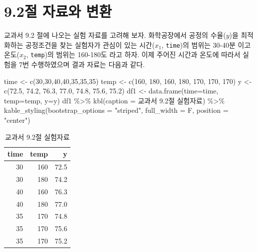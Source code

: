 \documentclass[
]{book}
\newenvironment{Shaded}{\begin{snugshade}}{\end{snugshade}}
\newcommand{\AttributeTok}[1]{\textcolor[rgb]{0.77,0.63,0.00}{#1}}
\newcommand{\DecValTok}[1]{\textcolor[rgb]{0.00,0.00,0.81}{#1}}
\newcommand{\FloatTok}[1]{\textcolor[rgb]{0.00,0.00,0.81}{#1}}
\newcommand{\FunctionTok}[1]{\textcolor[rgb]{0.00,0.00,0.00}{#1}}
\newcommand{\NormalTok}[1]{#1}
\newcommand{\OtherTok}[1]{\textcolor[rgb]{0.56,0.35,0.01}{#1}}
\newcommand{\SpecialCharTok}[1]{\textcolor[rgb]{0.00,0.00,0.00}{#1}}
\newcommand{\StringTok}[1]{\textcolor[rgb]{0.31,0.60,0.02}{#1}}
\theoremstyle{definition}
\theoremstyle{definition}
\theoremstyle{definition}
\theoremstyle{definition}
\theoremstyle{remark}
\begin{document}
\hypertarget{uxc808-uxc790uxb8ccuxc640-uxbcc0uxd658}{%
\section{9.2절 자료와 변환}\label{uxc808-uxc790uxb8ccuxc640-uxbcc0uxd658}}

교과서 9.2 절에 나오는 실험 자료를 고려해 보자. 화학공장에서 공정의 수율(\(y\))을 최적화하는 공정조건을 찾는 실험자가 관심이 있는 시간(\(x_1\), \texttt{time})의 범위는 30-40분 이고 온도(\(x_2\), \texttt{temp})의 범위는 160-180도 라고 하자.
이제 주어진 시간과 온도에 따라서 실험을 7번 수행하였으며 결과 자료는 다음과 같다.

\begin{Shaded}
\begin{Highlighting}[]
\NormalTok{time }\OtherTok{\textless{}{-}} \FunctionTok{c}\NormalTok{(}\DecValTok{30}\NormalTok{,}\DecValTok{30}\NormalTok{,}\DecValTok{40}\NormalTok{,}\DecValTok{40}\NormalTok{,}\DecValTok{35}\NormalTok{,}\DecValTok{35}\NormalTok{,}\DecValTok{35}\NormalTok{)}
\NormalTok{temp }\OtherTok{\textless{}{-}} \FunctionTok{c}\NormalTok{(}\DecValTok{160}\NormalTok{, }\DecValTok{180}\NormalTok{, }\DecValTok{160}\NormalTok{, }\DecValTok{180}\NormalTok{, }\DecValTok{170}\NormalTok{, }\DecValTok{170}\NormalTok{, }\DecValTok{170}\NormalTok{)}
\NormalTok{y }\OtherTok{\textless{}{-}} \FunctionTok{c}\NormalTok{(}\FloatTok{72.5}\NormalTok{, }\FloatTok{74.2}\NormalTok{, }\FloatTok{76.3}\NormalTok{, }\FloatTok{77.0}\NormalTok{, }\FloatTok{74.8}\NormalTok{, }\FloatTok{75.6}\NormalTok{, }\FloatTok{75.2}\NormalTok{)}
\NormalTok{df1 }\OtherTok{\textless{}{-}} \FunctionTok{data.frame}\NormalTok{(}\AttributeTok{time=}\NormalTok{time, }\AttributeTok{temp=}\NormalTok{temp, }\AttributeTok{y=}\NormalTok{y)}
\NormalTok{df1 }\SpecialCharTok{\%\textgreater{}\%}  \FunctionTok{kbl}\NormalTok{(}\AttributeTok{caption =} \StringTok{\textquotesingle{}교과서 9.2절 실험자료\textquotesingle{}}\NormalTok{) }\SpecialCharTok{\%\textgreater{}\%} \FunctionTok{kable\_styling}\NormalTok{(}\AttributeTok{bootstrap\_options =} \StringTok{"striped"}\NormalTok{, }\AttributeTok{full\_width =}\NormalTok{ F, }\AttributeTok{position =} \StringTok{"center"}\NormalTok{)}
\end{Highlighting}
\end{Shaded}

\begin{table}

\caption{\label{tab:unnamed-chunk-2}교과서 9.2절 실험자료}
\centering
\begin{tabular}[t]{r|r|r}
\hline
time & temp & y\\
\hline
30 & 160 & 72.5\\
\hline
30 & 180 & 74.2\\
\hline
40 & 160 & 76.3\\
\hline
40 & 180 & 77.0\\
\hline
35 & 170 & 74.8\\
\hline
35 & 170 & 75.6\\
\hline
35 & 170 & 75.2\\
\hline
\end{tabular}
\end{table}
\end{document}
